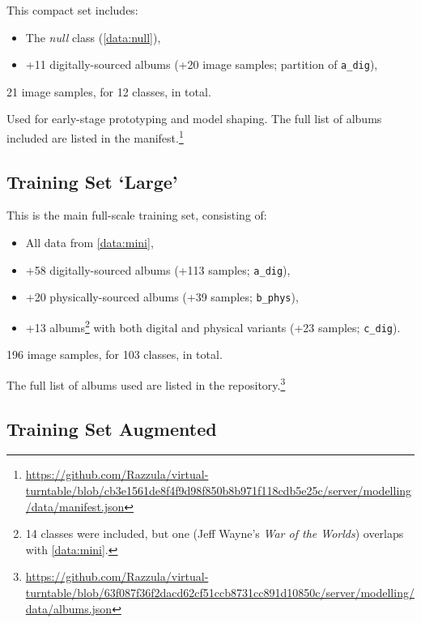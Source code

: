 \begin{uomappendix}
                This compact set includes:
                \begin{itemize}
                    \item The \textit{null} class (\ref{data:null}),
                    \item +11 digitally-sourced albums (+20 image samples; partition of \texttt{a\_dig}),
                \end{itemize}
    
                21 image samples, for 12 classes, in total.
    
                Used for early-stage prototyping and model shaping. The full list of albums included are listed in the manifest.\footnote{\url{https://github.com/Razzula/virtual-turntable/blob/cb3e1561de8f4f9d98f850b8b971f118cdb5e25c/server/modelling/data/manifest.json}}
    
            \subsection{Training Set `Large'} \label{data:large}
    
                This is the main full-scale training set, consisting of:
                \begin{itemize}
                    \item All data from \ref{data:mini},
                    \item +58 digitally-sourced albums (+113 samples; \texttt{a\_dig}),
                    \item +20 physically-sourced albums (+39 samples; \texttt{b\_phys}),
                    \item +13 albums\footnote{14 classes were included, but one (Jeff Wayne's \textit{War of the Worlds}) overlaps with \ref{data:mini}.} with both digital and physical variants (+23 samples; \texttt{c\_dig}).
                \end{itemize}
    
                196 image samples, for 103 classes, in total.
                
                The full list of albums used are listed in the repository.\footnote{\url{https://github.com/Razzula/virtual-turntable/blob/63f087f36f2dacd62cf51ccb8731cc891d10850c/server/modelling/data/albums.json}}
    
            \subsection{Training Set Augmented} \label{data:aug}
    

\end{uomappendix}
